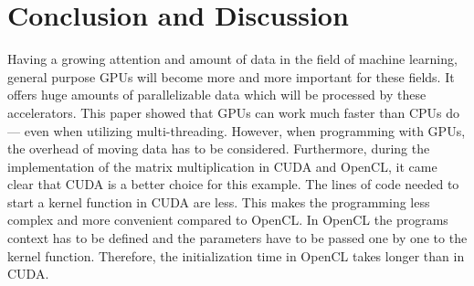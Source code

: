 \section{Conclusion and Discussion}
Having a growing attention and amount of data in the field of machine learning, general purpose GPUs will become more and more important for these fields.
It offers huge amounts of parallelizable data which will be processed by these accelerators.
This paper showed that GPUs can work much faster than CPUs do --- even when utilizing multi-threading.
However, when programming with GPUs, the overhead of moving data has to be considered.
Furthermore, during the implementation of the matrix multiplication in CUDA and OpenCL, it came clear that CUDA is a better choice for this example.
The lines of code needed to start a kernel function in CUDA are less.
This makes the programming less complex and more convenient compared to OpenCL.
In OpenCL the programs context has to be defined and the parameters have to be passed one by one to the kernel function.
Therefore, the initialization time in OpenCL takes longer than in CUDA.
